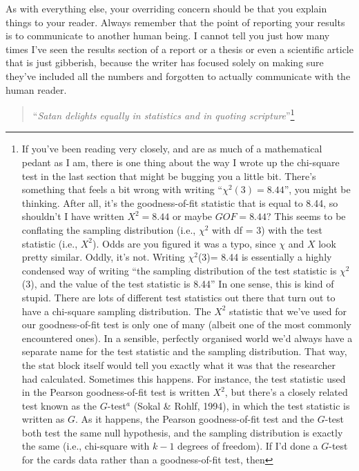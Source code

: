 \documentclass[
  a4paper,
]{book}
\begin{document}
As with everything else, your overriding concern should be that you
explain things to your reader. Always remember that the point of
reporting your results is to communicate to another human being. I
cannot tell you just how many times I've seen the results section of a
report or a thesis or even a scientific article that is just gibberish,
because the writer has focused solely on making sure they've included
all the numbers and forgotten to actually communicate with the human
reader.

\begin{quote}
``\emph{Satan delights equally in statistics and in quoting
scripture}''\footnote{If you've been reading very closely, and are as
  much of a mathematical pedant as I am, there is one thing about the
  way I wrote up the chi-square test in the last section that might be
  bugging you a little bit. There's something that feels a bit wrong
  with writing ``\(\chi^2(3) = 8.44\)'', you might be thinking. After
  all, it's the goodness-of-fit statistic that is equal to 8.44, so
  shouldn't I have written \(X^2 = 8.44\) or maybe \(GOF = 8.44\)? This
  seems to be conflating the sampling distribution (i.e., \(\chi^2\)
  with df = 3) with the test statistic (i.e., \(X^2\)). Odds are you
  figured it was a typo, since \(\chi\) and \(X\) look pretty similar.
  Oddly, it's not. Writing \(\chi^2\)(3)= 8.44 is essentially a highly
  condensed way of writing ``the sampling distribution of the test
  statistic is \(\chi^2\)(3), and the value of the test statistic is
  8.44'' In one sense, this is kind of stupid. There are lots of
  different test statistics out there that turn out to have a chi-square
  sampling distribution. The \(X^2\) statistic that we've used for our
  goodness-of-fit test is only one of many (albeit one of the most
  commonly encountered ones). In a sensible, perfectly organised world
  we'd always have a separate name for the test statistic and the
  sampling distribution. That way, the stat block itself would tell you
  exactly what it was that the researcher had calculated. Sometimes this
  happens. For instance, the test statistic used in the Pearson
  goodness-of-fit test is written \(X^2\), but there's a closely related
  test known as the \(G\)-test\(^a\) (Sokal \& Rohlf, 1994), in which
  the test statistic is written as \(G\). As it happens, the Pearson
  goodness-of-fit test and the \(G\)-test both test the same null
  hypothesis, and the sampling distribution is exactly the same (i.e.,
  chi-square with \(k - 1\) degrees of freedom). If I'd done a
  \(G\)-test for the cards data rather than a goodness-of-fit test, then
}
\end{quote}
\end{document}
